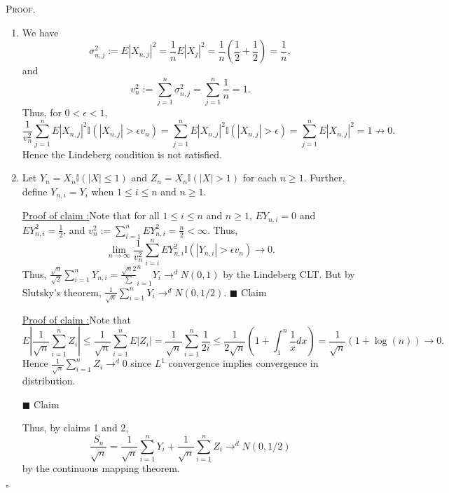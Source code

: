 \documentclass[12pt]{article}
\newcounter{ProofCounter}
\newcounter{ClaimCounter}[ProofCounter]
\newenvironment{Proof}{\stepcounter{ProofCounter}\textsc{Proof.}}{\hfill$\square$}
\newenvironment{claim}[1]{\vspace{1mm}\stepcounter{ClaimCounter}\par\noindent\underline{\bf Claim \theClaimCounter:}\space#1}{}
\newenvironment{claimproof}[1]{\par\noindent\underline{Proof of claim \theClaimCounter:}\space#1}{\hfill $\blacksquare$ Claim \theClaimCounter}
\begin{document}
\begin{Proof}
  \begin{enumerate}[label = (\alph*)]
    \item We have 
      \[ \sigma_{n,j}^{2} := E|X_{n,j}|^{2} = \frac{1}{n}E|X_{j}|^{2} = \frac{1}{n}\left( \frac{1}{2} + \frac{1}{2} \right) = \frac{1}{n}, \]
      and 
      \[ v_{n}^{2} := \sum_{j=1}^{n}\sigma_{n,j}^{2} = \sum_{j=1}^{n}\frac{1}{n} = 1. \]
      Thus, for $0 < \epsilon < 1$,
      \[ 
        \frac{1}{v_{n}^{2}}\sum_{j=1}^{n}E|X_{n,j}|^{2}\mathbb{I} (|X_{n,j}| > \epsilon v_{n}) = \sum_{j=1}^{n}E|X_{n,j}|^{2}\mathbb{I} (|X_{n,j}| >
        \epsilon) = \sum_{j=1}^{n}E|X_{n,j}|^{2} = 1 \not\rightarrow 0. 
      \]
      Hence the Lindeberg condition is not satisfied.
    \item Let $Y_{n} = X_{n}\mathbb{I} (|X| \leq 1)$ and $Z_{n} = X_{n}\mathbb{I} (|X| > 1)$ for each $n \geq 1$. Further, define $Y_{n,i} = Y_{i}$
      when $1 \leq i\leq n$ and $n \geq 1$.
      \begin{claimproof}
        Note that for all $1 \leq i \leq n$ and $n\geq 1$, 
        $EY_{n,i} = 0$ and $EY_{n,i}^{2} = \frac{1}{2}$, and $v_{n}^{2} := \sum_{i=1}^{n}EY_{n,i}^{2} = \frac{n}{2} < \infty$. Thus,
        \[ \lim_{n\rightarrow\infty}\frac{1}{v_{n}^{2}}\sum_{i=i}^{n}EY_{n,i}^{2}\mathbb{I} (|Y_{n,i}| > \epsilon v_{n}) \rightarrow 0. \]
        Thus, $\frac{\sqrt{n}}{\sqrt{2}}\sum_{i=1}^{n}Y_{n,i} = \frac{\sqrt{n}{2}}\sum_{i=1}^{n}Y_{i} \rightarrow^{d} N(0,1)$ by the Lindeberg CLT.
        But by Slutsky's theorem, $\frac{1}{\sqrt{n}}\sum_{i=1}^{n}Y_{i} \rightarrow^{d} N(0,1/2)$.
      \end{claimproof}

      \begin{claimproof}
        Note that 
        \[
          E\left|\frac{1}{\sqrt{n}}\sum_{i=1}^{n}Z_{i}\right| \leq \frac{1}{\sqrt{n}}\sum_{i=1}^{n}E|Z_{i}| =
          \frac{1}{\sqrt{n}}\sum_{i=1}^{n}\frac{1}{2i} \leq \frac{1}{2\sqrt{n}}\left( 1 + \int_{1}^{n}\frac{1}{x}dx \right) = \frac{1}{\sqrt{n}}(1 +
          \log(n)) \rightarrow 0.
        \]
        Hence $\frac{1}{\sqrt{n}}\sum_{i=1}^{n}Z_{i} \rightarrow^{d} 0$ since $L^{1}$ convergence implies convergence in distribution.

      \end{claimproof}

      Thus, by claims 1 and 2,
      \[
        \frac{S_n}{\sqrt{n}} = \frac{1}{\sqrt{n}}\sum_{i=1}^{n}Y_{i} + \frac{1}{\sqrt{n}}\sum_{i=1}^{n}Z_{i} \rightarrow^{d} N(0,1/2)
      \]
      by the continuous mapping theorem.
  \end{enumerate}
\end{Proof}
\end{document}
